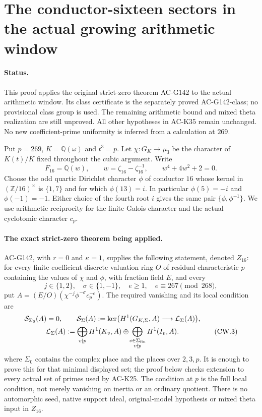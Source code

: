 \section{The conductor-sixteen sectors in the actual growing arithmetic window}
\label{sec:conductor16-actual-window-reduction}

\paragraph{Status.}
This proof applies the original strict-zero theorem AC-G142 to the
actual arithmetic window.  Its class certificate is the separately proved
AC-G142-class; no provisional class group is used.  The remaining
arithmetic bound and mixed theta realization are still unproved.
All other hypotheses in AC-K35 remain unchanged.  No new coefficient-prime
uniformity is inferred from a calculation at $269$.

Put $p=269$, $K=\mathbb Q(\omega)$ and $t^3=p$.
Let $\chi:G_K\to\mu_3$ be the character of $K(t)/K$ fixed throughout
the cubic argument.  Write
\[
 F_{16}=\mathbb Q(w),\qquad w=\zeta_{16}-\zeta_{16}^{-1},
 \qquad w^4+4w^2+2=0.
 \tag{CW.1}
\]
Choose the odd quartic Dirichlet character $\phi$ of conductor $16$
whose kernel in $(\mathbb Z/16)^\times$ is $\{1,7\}$ and for which
$\phi(13)=i$.  In particular $\phi(5)=-i$ and $\phi(-1)=-1$.
Either choice of the fourth root $i$ gives the same pair
$\{\phi,\phi^{-1}\}$.  We use arithmetic reciprocity for the finite
Galois character and the actual cyclotomic character $c_p$.

\paragraph{The exact strict-zero theorem being applied.}
AC-G142, with $r=0$ and $\kappa=1$, supplies the following statement,
denoted $Z_{16}$:
for every finite coefficient discrete valuation ring $O$ of residual
characteristic $p$ containing the values of $\chi$ and $\phi$, with
fraction field $E$, and every
\[
 j\in\{1,2\},\quad \sigma\in\{1,-1\},\quad
 e\geq1,\quad e\equiv267\pmod{268},
 \tag{CW.2}
\]
put $A=(E/O)(\chi^{-j}\phi^{-\sigma}c_p^{-e})$.  The required
vanishing and its local condition are
\[
 \begin{gathered}
 \mathcal S_{\Sigma_0}(A)=0,\qquad
 \mathcal S_\Sigma(A):=
 \ker\bigl(H^1(G_{K,\Sigma},A)\longrightarrow\mathcal L_\Sigma(A)\bigr),\\
 \mathcal L_\Sigma(A):=
 \bigoplus_{v\mid p}H^1(K_v,A)
       \oplus\!\bigoplus_{\substack{v\in\Sigma_{\rm fin}\\v\nmid p}}
                                      H^1(I_v,A).
 \end{gathered}
 \tag{CW.3}
\]
where $\Sigma_0$ contains the complex place and the places over $2,3,p$.
It is enough to prove this for that minimal displayed set; the proof
below checks extension to every actual set of primes used by AC-K25.
The condition at $p$ is the full local condition, not merely vanishing
on inertia or an ordinary quotient.  There is no automorphic seed,
native support ideal, original-model hypothesis or mixed theta input
in $Z_{16}$.

